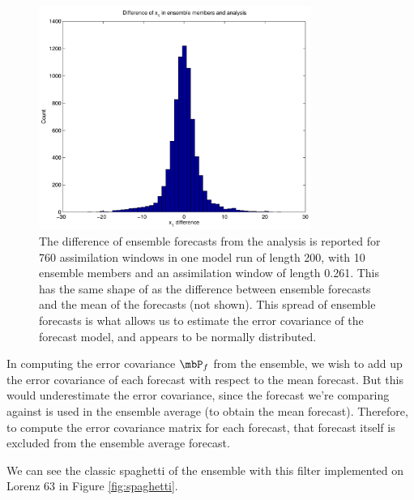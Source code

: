 \begin{figure}[h!]
  \centering
  \includegraphics[width=0.79\textwidth]{figures/EnKF-histogram-analysis.pdf}
  \caption[The difference of ensemble forecasts from the analysis is reported for 760 assimilation windows in one model run of length 200, with 10 ensemble members and an assimilation window of length 0.261]{
    The difference of ensemble forecasts from the analysis is reported for 760 assimilation windows in one model run of length 200, with 10 ensemble members and an assimilation window of length 0.261.
    This has the same shape of as the difference between ensemble forecasts and the mean of the forecasts (not shown).
    This spread of ensemble forecasts is what allows us to estimate the error covariance of the forecast model, and appears to be normally distributed.
  }
  \label{fig:EnKFhist}
\end{figure}

In computing the error covariance $\mbP_f$ from the ensemble, we wish to add up the error covariance of each forecast with respect to the mean forecast. 
But this would underestimate the error covariance, since the forecast we're comparing against is used in the ensemble average (to obtain the mean forecast).
Therefore, to compute the error covariance matrix for each forecast, that forecast itself is excluded from the ensemble average forecast.

We can see the classic spaghetti of the ensemble with this filter implemented on Lorenz 63 in Figure \ref{fig:spaghetti}.

